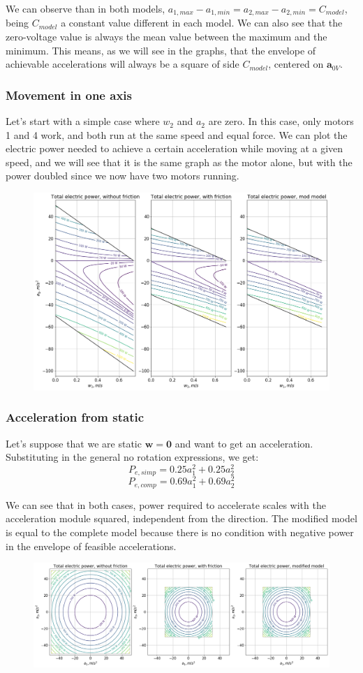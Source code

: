 \documentclass[12pt]{article}
\renewcommand{\vec}[1]{\bm{#1}}
\begin{document}
We can observe than in both models, $a_{1,max} - a_{1,min} = a_{2,max} - a_{2,min} = C_{model}$, being $C_{model}$ a constant value different in each model. We can also see that the zero-voltage value is always the mean value between the maximum and the minimum. This means, as we will see in the graphs, that the envelope of achievable accelerations will always be a square of side $C_{model}$, centered on $\vec a_{0V}$.
\subsubsection*{Movement in one axis}
Let's start with a simple case where $w_2$ and $a_2$ are zero. In this case, only motors 1 and 4 work, and both run at the same speed and equal force. We can plot the electric power needed to achieve a certain acceleration while moving at a given speed, and we will see that it is the same graph as the motor alone, but with the power doubled since we now have two motors running.

\begin{figure}[h]
	\centering
	\includegraphics[width=.5\linewidth]{total_electric_power_w_and_wout_fricc}
	\label{fig:power_f_a1_w1}
\end{figure}

\subsubsection*{Acceleration from static}
Let's suppose that we are static $\vec{w} = \vec{0}$ and want to get an acceleration. Substituting in the general no rotation expressions, we get:
$$P_{e, simp} = 0.25 a_{1}^{2} + 0.25 a_{2}^{2}$$
$$P_{e, comp} = 0.69 a_{1}^{2} + 0.69 a_{2}^{2}$$

We can see that in both cases, power required to accelerate scales with the acceleration module squared, independent from the direction. The modified model is equal to the complete model because there is no condition with negative power in the envelope of feasible accelerations.
\begin{figure}[h]
	\centering
	\includegraphics[width=.8\linewidth]{power_from_static}
	\label{fig:power_from_static}
\end{figure}
\end{document}
